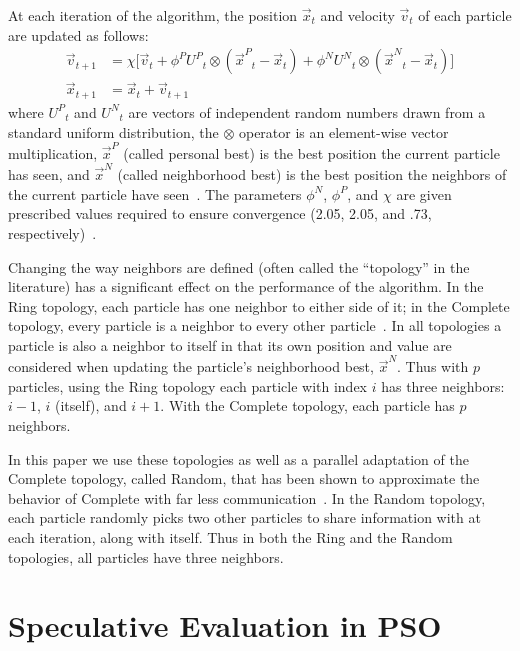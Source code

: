 \documentclass{llncs}
\providecommand{\pers}{\ensuremath{P}}
\providecommand{\neigh}{\ensuremath{N}}
\providecommand{\nURand}{\ensuremath{U^\neigh}}
\providecommand{\pURand}{\ensuremath{U^\pers}}
\providecommand{\ppos}{\ensuremath{\Vec{x}}}
\providecommand{\pvel}{\ensuremath{\Vec{v}}}
\providecommand{\nbest}{\ensuremath{\Vec{x}^\neigh}}
\providecommand{\pbest}{\ensuremath{\Vec{x}^\pers}}
\providecommand{\constriction}{\ensuremath{\chi}}
\providecommand{\ncoeff}{\ensuremath{\phi^\neigh}}
\providecommand{\pcoeff}{\ensuremath{\phi^\pers}}
\begin{document}
At each iteration of the algorithm, the position $\ppos_t$ and velocity
$\pvel_t$ of each particle are updated as follows:
\begin{align}
\label{eq:velupdate}
	\pvel_{t+1} &=
		\constriction \bigl[ \pvel_t
			+ \pcoeff\pURand_{t}\otimes(\pbest_{t} - \ppos_{t})
			+ \ncoeff\nURand_{t}\otimes(\nbest_{t} - \ppos_{t})
		\bigr] \\
\label{eq:posupdate}
	\ppos_{t+1} &= \ppos_{t} + \pvel_{t+1}
\end{align}
where \( \pURand_{t} \) and \( \nURand_{t} \) are vectors of independent random
numbers drawn from a standard uniform distribution, the \( \otimes \) operator
is an element-wise vector multiplication, $\pbest$ (called personal best) is
the best position the current particle has seen, and $\nbest$ (called
neighborhood best) is the best position the neighbors of the current particle
have seen~\cite{bratton-2007-defining-a-standard-for-pso}.  The parameters \(
\ncoeff \), \( \pcoeff \), and \( \constriction \) are given prescribed values
required to ensure convergence (2.05, 2.05, and .73,
respectively)~\cite{clerc-2002-constricted-pso}. 

Changing the way neighbors are defined (often called the ``topology'' in the
literature) has a significant effect on the performance of the algorithm.  In
the Ring topology, each particle has one neighbor to either side of it; in the
Complete topology, every particle is a neighbor to every other
particle~\cite{bratton-2007-defining-a-standard-for-pso}.  In all topologies a
particle is also a neighbor to itself in that its own position and value are
considered when updating the particle's neighborhood best, $\nbest$.  Thus with
$p$ particles, using the Ring topology each particle with index $i$ has three
neighbors: $i-1$, $i$ (itself), and $i+1$.  With the Complete topology, each
particle has $p$ neighbors.

In this paper we use these topologies as well as a parallel adaptation of the
Complete topology, called Random, that has been shown to approximate the
behavior of Complete with far less
communication~\cite{mcnabb-2009-large-particle-swarms}.  In the Random
topology, each particle randomly picks two other particles to share information
with at each iteration, along with itself.  Thus in both the Ring and the
Random topologies, all particles have three neighbors.

\section{Speculative Evaluation in PSO}
\label{sec:sepso}
\end{document}
